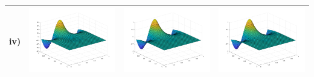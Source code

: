 \documentclass[11pt]{article}
\theoremstyle{definition}
\theoremstyle{remark}
\theoremstyle{plain}
\begin{document}
\begin{center}
\begin{tabular}{|>{\centering\arraybackslash}r|m{4.3cm}|m{4.3cm}|m{4.3cm}|}
    iv)&\includegraphics[width=\linewidth]{../Figures/poisson_rhs_4.png}&\includegraphics[width=\linewidth]{../Figures/poisson_actual_4.png}&\includegraphics[width=\linewidth]{../Figures/poisson_approx_4.png}\\\hline

\end{tabular}
\end{center}
\end{document}
